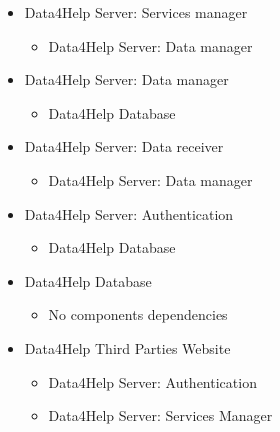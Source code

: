 \documentclass[../DD.tex]{subfiles}
\begin{document}
\begin{itemize}
			\item{Data4Help Server: Services manager}
			\begin{itemize}\item{Data4Help Server: Data manager}\end{itemize}

			\item{Data4Help Server: Data manager}
			\begin{itemize}\item{Data4Help Database}\end{itemize}

			\item{Data4Help Server: Data receiver}
			\begin{itemize}\item{Data4Help Server: Data manager}\end{itemize}

			\item{Data4Help Server: Authentication}
			\begin{itemize}\item{Data4Help Database}\end{itemize}

			\item{Data4Help Database}
			\begin{itemize}\item{No components dependencies}\end{itemize}

			\item{Data4Help Third Parties Website}
			\begin{itemize}\item{Data4Help Server: Authentication} \item{Data4Help Server: Services Manager}\end{itemize}
			
		\end{itemize}
\end{document}
